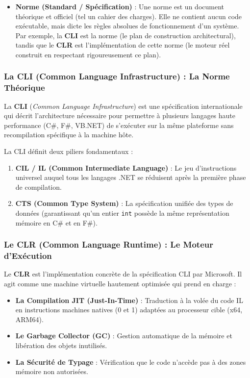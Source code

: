 \begin{itemize}
    \item \textbf{Norme (Standard / Spécification)} : 
    Une norme est un document théorique et officiel (tel un cahier des charges). Elle ne contient aucun code exécutable, mais dicte les règles absolues de fonctionnement d'un système. Par exemple, la \textbf{CLI} est la norme (le plan de construction architectural), tandis que le \textbf{CLR} est l'implémentation de cette norme (le moteur réel construit en respectant rigoureusement ce plan).
\end{itemize}

\subsubsection{La CLI (Common Language Infrastructure) : La Norme Théorique}

La \textbf{CLI} (\emph{Common Language Infrastructure}) est une spécification internationale qui décrit l'architecture nécessaire pour permettre à plusieurs langages haute performance (C\#, F\#, VB.NET) de s'exécuter sur la même plateforme sans recompilation spécifique à la machine hôte.

La CLI définit deux piliers fondamentaux :
\begin{enumerate}
    \item \textbf{CIL / IL (Common Intermediate Language)} : Le jeu d'instructions universel auquel tous les langages .NET se réduisent après la première phase de compilation.
    \item \textbf{CTS (Common Type System)} : La spécification unifiée des types de données (garantissant qu'un entier \texttt{int} possède la même représentation mémoire en C\# et en F\#).
\end{enumerate}

\subsubsection{Le CLR (Common Language Runtime) : Le Moteur d'Exécution}

Le \textbf{CLR} est l'implémentation concrète de la spécification CLI par Microsoft. Il agit comme une machine virtuelle hautement optimisée qui prend en charge :

\begin{itemize}
    \item \textbf{La Compilation JIT (Just-In-Time)} : Traduction à la volée du code IL en instructions machines natives (0 et 1) adaptées au processeur cible (x64, ARM64).
    \item \textbf{Le Garbage Collector (GC)} : Gestion automatique de la mémoire et libération des objets inutilisés.
    \item \textbf{La Sécurité de Typage} : Vérification que le code n'accède pas à des zones mémoire non autorisées.
\end{itemize}

